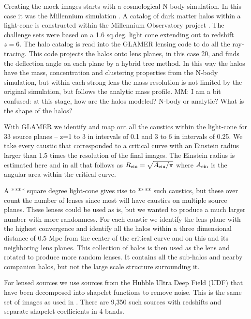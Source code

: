 \documentclass[useAMS,usenatbib]{mnras}
\begin{document}
Creating the mock images starts with a cosmological N-body simulation.  In this case it was the Millennium simulation \citep{2009MNRAS.398.1150B}.   A catalog of dark matter halos within a light-cone is constructed within the Millennium Observatory project \citep{2013MNRAS.428..778O}.   The challenge sets were based on a 1.6 sq.deg. light cone extending out to redshift $z=6$.
The halo catalog is read into the GLAMER lensing code \citep{2014MNRAS.445.1942M,2014MNRAS.445.1954P} to do all the ray-tracing.  This code projects the halos onto lens planes, in this case 20, and finds the deflection angle on each plane by a hybrid tree method.  In this way the halos have the mass, concentration and clustering properties from the N-body simulation, but within each strong lens the mass resolution is not limited by the original simulation, but follows the analytic mass profile. {\color{red} MM: I am a bit confused: at this stage, how are the halos modeled? N-body or analytic? What is the shape of the halos?} 

With GLAMER we identify and map out all the caustics within the light-cone for 33 source planes -- z=1 to 3 in intervals of 0.1 and 3 to 6 in intervals of 0.25.  We take every caustic that corresponded to a critical curve with an Einstein radius larger than 1.5 times the resolution of the final images.  The Einstein radius is estimated here and in all that follows as $R_{\rm ein}=\sqrt{A_{\rm ein}/\pi}$ where $A_{\rm ein}$ is the angular area within the critical curve.

 A **** square degree light-cone gives rise to **** such caustics, but these over count the number of lenses since most will have caustics on multiple source planes.  These lenses could be used as is, but we wanted to produce a much larger number with more randomness.   For each caustic we identify the lens plane with the highest convergence and identify all the halos within a three dimensional distance of 0.5 Mpc from the center of the critical curve and on this and its neighboring lens planes.    This collection of halos is then used as the lens and rotated to produce more random lenses.    It  contains all the sub-halos and nearby companion halos, but not the large scale structure surrounding it.

For lensed sources we use sources from the Hubble Ultra Deep Field (UDF) that have been decomposed into shapelet functions to remove noise.  This is the same set of images as used 
in  \citep{2008A&A...482..403M,2010A&A...514A..93M,2016arXiv160604548M}.   There are 9,350 such sources with redshifts and separate shapelet coefficients in 4 bands.   
\end{document}
